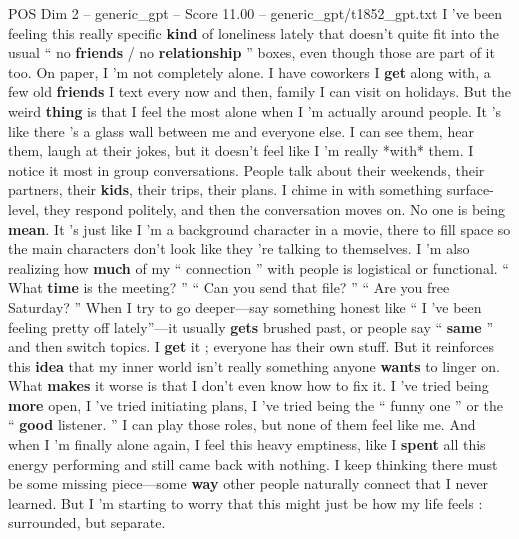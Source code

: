 \begin{textsample}{POS Dim 2 – generic\_gpt – Score 11.00 – generic\_gpt/t1852\_gpt.txt}  \label{ex:f2_pos_035}
I ’ve been feeling this really specific \textbf{kind} of loneliness lately that doesn't quite fit into the usual “ no \textbf{friends} / no \textbf{relationship} ” boxes, even though those are part of it too.
On paper, I ’m not completely alone.
I have coworkers I \textbf{get} along with, a few old \textbf{friends} I text every now and then, family I can visit on holidays.
But the weird \textbf{thing} is that I feel the most alone when I ’m actually around people.
It ’s like there ’s a glass wall between me and everyone else.
I can see them, hear them, laugh at their jokes, but it doesn't feel like I ’m really *with* them.
I notice it most in group conversations.
People talk about their weekends, their partners, their \textbf{kids}, their trips, their plans.
I chime in with something surface-level, they respond politely, and then the conversation moves on.
No one is being \textbf{mean}.
It ’s just like I ’m a background character in a movie, there to fill space so the main characters don't look like they ’re talking to themselves.
I ’m also realizing how \textbf{much} of my “ connection ” with people is logistical or functional. “ What \textbf{time} is the meeting? ” “ Can you send that file? ” “ Are you free Saturday? ” When I try to go deeper—say something honest like “ I ’ve been feeling pretty off lately”—it usually \textbf{gets} brushed past, or people say “ \textbf{same} ” and then switch topics.
I \textbf{get} it ; everyone has their own stuff.
But it reinforces this \textbf{idea} that my inner world isn't really something anyone \textbf{wants} to linger on.
What \textbf{makes} it worse is that I don't even know how to fix it.
I ’ve tried being \textbf{more} open, I ’ve tried initiating plans, I ’ve tried being the “ funny one ” or the “ \textbf{good} listener. ” I can play those roles, but none of them feel like me.
And when I ’m finally alone again, I feel this heavy emptiness, like I \textbf{spent} all this energy performing and still came back with nothing.
I keep thinking there must be some missing piece—some \textbf{way} other people naturally connect that I never learned.
But I ’m starting to worry that this might just be how my life feels : surrounded, but separate.

\end{textsample}
